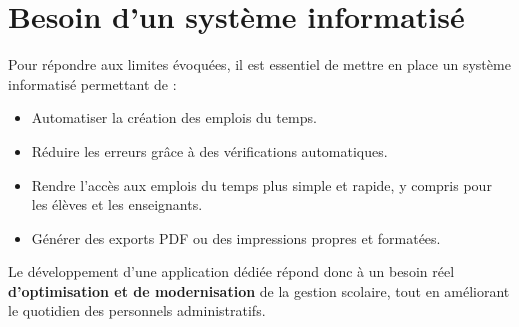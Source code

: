 \documentclass[english,12pt,a4paper]{report}
\begin{document}
\section{Besoin d’un système informatisé}
Pour répondre aux limites évoquées, il est essentiel de mettre en place un système informatisé permettant de :
\begin{itemize}
	\item Automatiser la création des emplois du temps.
	\item Réduire les erreurs grâce à des vérifications automatiques.
	\item Rendre l’accès aux emplois du temps plus simple et rapide, y compris pour les élèves et les enseignants.
	\item Générer des exports PDF ou des impressions propres et formatées.
\end{itemize}
Le développement d’une application dédiée répond donc à un besoin réel \textbf{d’optimisation et de modernisation} de la gestion scolaire, tout en améliorant le quotidien des personnels administratifs.

\end{document}
